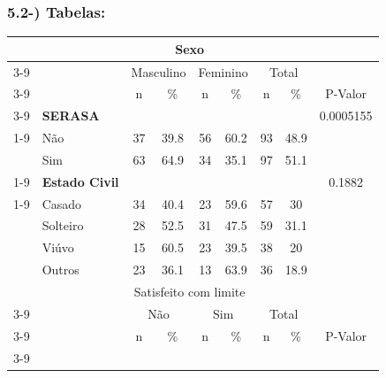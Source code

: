 \documentclass[]{article}
\begin{document}
\subsubsection{5.2-) Tabelas:}\label{tabelas}

\begin{table}[t!]
    \centering
        \begin{tabular}{c c c c c c c c c}
            \toprule
            \midrule
                & & \multicolumn{4}{c}{Sexo}\\ \cmidrule{3-9}
                && \multicolumn{2}{c}{Masculino} & \multicolumn{2}{c}{Feminino} & \multicolumn{2}{c}{Total} \\ \cmidrule{3-9}
                && n & \% & n & \% & n & \% & P-Valor \\ \cmidrule{3-9}
                \multicolumn{1}{c}{\multirow{5}{*}}   &
                \multicolumn{1}{l}{\textbf{SERASA}} &  &  &  & & &  & 0.0005155 \\ \cmidrule{1-9}
                \multicolumn{1}{c}{}    &
                \multicolumn{1}{l}{Não} & 37 & 39.8 & 56 & 60.2 & 93 & 48.9 &  \\
                \multicolumn{1}{c}{}    &
                \multicolumn{1}{l}{Sim}& 63 & 64.9 & 34 & 35.1 & 97 & 51.1  \\ \cmidrule{1-9} &
                \multicolumn{1}{l}{\textbf{Estado Civil}} &  &  &  & & &  & 0.1882 \\ \cmidrule{1-9}                
                \multicolumn{1}{c}{}    &
                \multicolumn{1}{l}{Casado} & 34 & 40.4 & 23 & 59.6 & 57 & 30 &  \\
                \multicolumn{1}{c}{}    &   
                \multicolumn{1}{l}{Solteiro} & 28 & 52.5 & 31 & 47.5 & 59 & 31.1 &  \\
                \multicolumn{1}{c}{}    &
                \multicolumn{1}{l}{Viúvo} & 15 & 60.5 & 23 & 39.5 & 38 & 20   \\
                \multicolumn{1}{c}{}    &
                \multicolumn{1}{l}{Outros} & 23 & 36.1 & 13 & 63.9& 36 & 18.9   \\  
                \toprule
                \midrule 
                & & \multicolumn{4}{c}{Satisfeito com limite}\\ \cmidrule{3-9}
                && \multicolumn{2}{c}{Não} & \multicolumn{2}{c}{Sim} & \multicolumn{2}{c}{Total}  \\ \cmidrule{3-9}
                && n & \% & n & \% & n & \% & P-Valor \\ \cmidrule{3-9}

\end{tabular}
\end{table}
\end{document}
